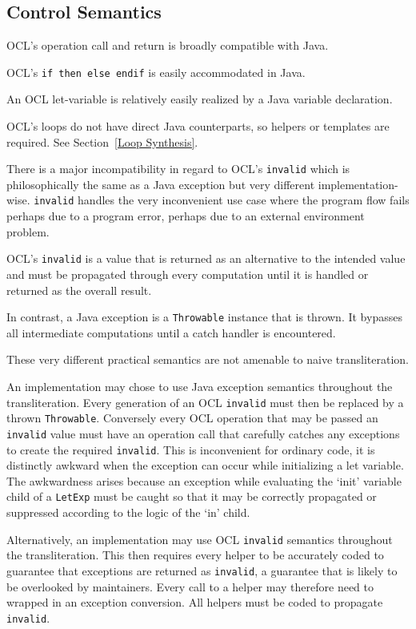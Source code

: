 \documentclass[sigconf]{acmart}
\begin{document}
\subsection{Control Semantics}

OCL's operation call and return is broadly compatible with Java.

OCL's \verb|if then else endif| is easily accommodated in Java.

An OCL let-variable is relatively easily realized by a Java variable declaration.

OCL's loops do not have direct Java counterparts, so helpers or templates are required. See Section~\ref{Loop Synthesis}.

There is a major incompatibility in regard to OCL's \verb|invalid| which is philosophically the same as a Java exception but very different implementation-wise.
\texttt{invalid} handles the very inconvenient use case where the program flow fails perhaps due to a program error, perhaps due to an external environment problem.

OCL's \texttt{invalid} is a value that is returned as an alternative to the intended value and must be propagated through every computation until it is handled or returned as the overall result.

In contrast, a Java exception is a \texttt{Throwable} instance that is thrown. It bypasses all intermediate computations until a catch handler is encountered.

These very different practical semantics are not amenable to naive transliteration.

An implementation may chose to use Java exception semantics throughout the transliteration. Every generation of an OCL \texttt{invalid} must then be replaced by a thrown \texttt{Throwable}. Conversely every OCL operation that may be passed an \texttt{invalid} value must have an operation call that carefully catches any exceptions to create the required \texttt{invalid}. This is inconvenient for ordinary code, it is distinctly awkward when the exception can occur while initializing a let variable. The awkwardness arises because an exception while evaluating the `init' variable child of a \texttt{LetExp} must be caught so that it may be correctly propagated or suppressed according to the logic of the `in' child.

Alternatively, an implementation may use OCL \texttt{invalid} semantics throughout the transliteration. This then requires every helper to be accurately coded to guarantee that exceptions are returned as \texttt{invalid}, a guarantee that is likely to be overlooked by maintainers. Every call to a helper may therefore need to wrapped in an exception conversion. All helpers must be coded to propagate \texttt{invalid}.
\end{document}
